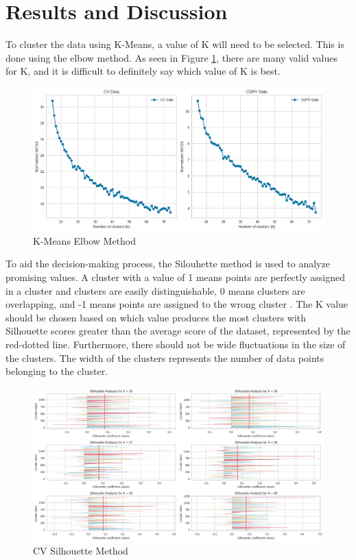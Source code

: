 \section{Results and Discussion}
To cluster the data using K-Means, a value of K will need to be selected. This is done using the elbow method. As seen in Figure \ref{elbow}, there are many valid values for K, and it is difficult to definitely say which value of K is best.
\begin{figure}[h!]
  \centering
    \includegraphics[width=1.0\textwidth]{figures/elbowmethod.png}
    \caption{K-Means Elbow Method}
    \label{elbow}
\end{figure}
To aid the decision-making process, the Silouhette method is used to analyze promising values. A cluster with a value of 1 means points are perfectly assigned in a cluster and clusters are easily distinguishable, 0 means clusters are overlapping, and -1 means points are assigned to the wrong cluster \cite{ROUSSEEUW198753}. The K value should be chosen based on which value produces the most clusters with Silhouette scores greater than the average score of the dataset, represented by the red-dotted line. Furthermore, there should not be wide fluctuations in the size of the clusters. The width of the clusters represents the number of data points belonging to the cluster. 
\begin{figure}[h!]
  \centering
    \includegraphics[width=1.0\textwidth]{figures/cv_silhouette.png}
    \caption{CV Silhouette Method}
    \label{cv_silhouette}
\end{figure}
